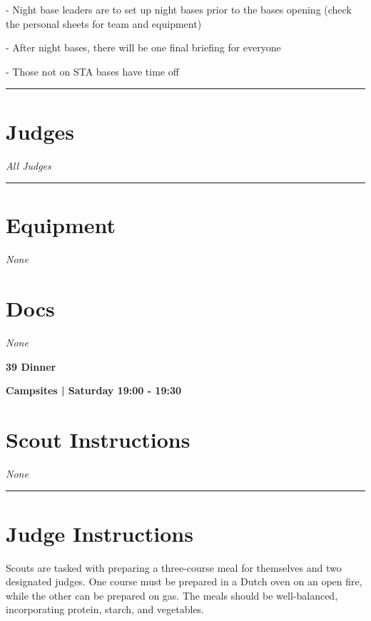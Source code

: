 \documentclass[10pt]{article}
\newcommand{\newtitle}[1]{\begin{center}{\Huge\bfseries #1 }\\ \vspace{5mm}\end{center}}
\newcommand{\newsubtitle}[1]{\begin{center}{\color{grey}\Large\bfseries #1 }\\ \vspace{5mm}\end{center}}
\begin{document}
- Night base leaders are to set up night bases prior to the bases opening (check the personal sheets for team and equipment)

- After night bases, there will be one final briefing for everyone

- Those not on STA bases have time off
\vspace{0.5cm}
	\hrule
	\vspace{0.5cm}
		\section*{\faUsers \: Judges}

					\textit{All Judges}
			\vspace{0.5cm}
	\hrule
	\vspace{0.5cm}

	\begin{multicols}{2}

		\section*{\faWrench \: Equipment}

				\textit{None}
		
		\vfill\null
		\columnbreak

			\section*{\faFile \: Docs}
		 	\textit{None}
	

		\vfill\null

		\end{multicols}



	\vspace{1cm}


	\clearpage
		\newtitle{39 Dinner }
	\newsubtitle{Campsites | Saturday 19:00 - 19:30}
		\setcounter{section}{38}
	\section*{Scout Instructions}
		\textit{None}
	
	\vspace{0.5cm}
	\hrule
	\vspace{0.5cm}

		\section*{Judge Instructions}
		Scouts are tasked with preparing a three-course meal for themselves and two designated judges. One course must be prepared in a Dutch oven on an open fire, while the other can be prepared on gas. The meals should be well-balanced, incorporating protein, starch, and vegetables. 
\end{document}
